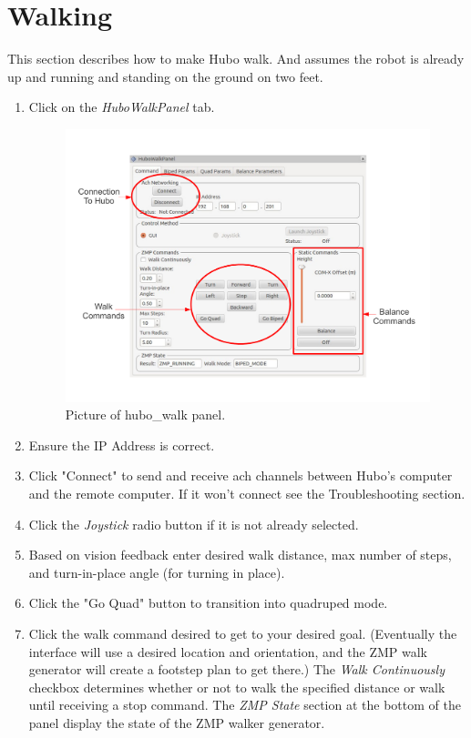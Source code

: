 \documentclass[letterpaper, 10 pt]{report}
\begin{document}
\section{Walking}
This section describes how to make Hubo walk. And assumes the robot is already up and running and standing on the ground on two feet.
  \begin{enumerate}
    \item Click on the \textit{HuboWalkPanel} tab.
    \begin{figure}[ht]
      \centering
      \includegraphics[width=15.0cm]{figures/hubo-walk.pdf}
      \caption{Picture of hubo\_walk panel.}
      \label{fig:hubo-walk-image}
    \end{figure}
    \item Ensure the IP Address is correct.
    \item Click "Connect" to send and receive ach channels between Hubo's computer and the remote computer. If it won't connect see the Troubleshooting section.
    \item Click the \textit{Joystick} radio button if it is not already selected.
    \item Based on vision feedback enter desired walk distance, max number of steps, and turn-in-place angle (for turning in place).
    \item Click the "Go Quad" button to transition into quadruped mode.
    \item Click the walk command desired to get to your desired goal. (Eventually the interface will use a desired location and orientation, and the ZMP walk generator will create a footstep plan to get there.) The \textit{Walk Continuously} checkbox determines whether or not to walk the specified distance or walk until receiving a stop command. The \textit{ZMP State} section at the bottom of the panel display the state of the ZMP walker generator.

\end{enumerate}
\end{document}

